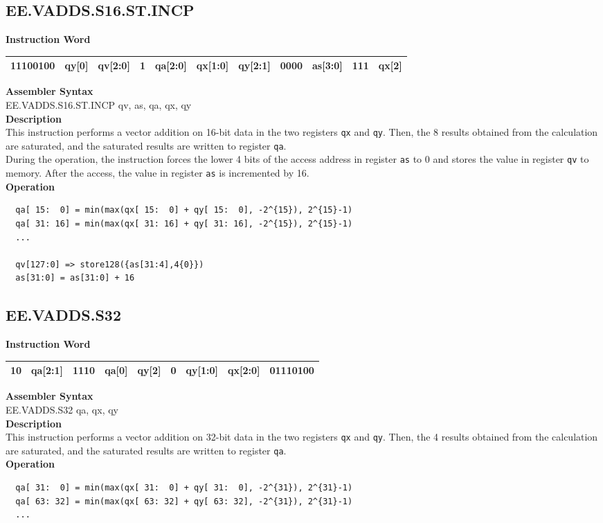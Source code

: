 \clearpage
\subsection{EE.VADDS.S16.ST.INCP}\label{instruction:EEVADDSS16STINCP}
\setlength\tabcolsep{6pt}
\textbf{Instruction Word} \\
\begin{tabular}{|c|c|c|c|c|c|c|c|c|c|c|}
	\hline
	11100100 & qy[0] & qv[2:0] & 1 & qa[2:0] & qx[1:0] & qy[2:1] & 0000 & as[3:0] & 111 & qx[2] \\
	\hline
\end{tabular}

\textbf{Assembler Syntax} \\
EE.VADDS.S16.ST.INCP qv, as, qa, qx, qy \\
\textbf{Description} \\
This instruction performs a vector addition on 16-bit data in the two registers \lstinline{qx} and \lstinline{qy}. Then, the 8 results obtained from the calculation are saturated, and the saturated results are written to register \lstinline{qa}. \\ During the operation, the instruction forces the lower 4 bits of the access address in register \lstinline{as} to 0 and stores the value in register \lstinline{qv} to memory. After the access, the value in register \lstinline{as} is incremented by 16.\\
\textbf{Operation}
\begin{lstlisting}
  qa[ 15:  0] = min(max(qx[ 15:  0] + qy[ 15:  0], -2^{15}), 2^{15}-1)
  qa[ 31: 16] = min(max(qx[ 31: 16] + qy[ 31: 16], -2^{15}), 2^{15}-1)
  ...

  qv[127:0] => store128({as[31:4],4{0}})
  as[31:0] = as[31:0] + 16
\end{lstlisting}

\clearpage
\subsection{EE.VADDS.S32}\label{instruction:EEVADDSS32}
\setlength\tabcolsep{6pt}
\textbf{Instruction Word} \\
\begin{tabular}{|c|c|c|c|c|c|c|c|c|}
	\hline
	10 & qa[2:1] & 1110 & qa[0] & qy[2] & 0 & qy[1:0] & qx[2:0] & 01110100 \\
	\hline
\end{tabular}

\textbf{Assembler Syntax} \\
EE.VADDS.S32 qa, qx, qy \\
\textbf{Description} \\
This instruction performs a vector addition on 32-bit data in the two registers \lstinline{qx} and \lstinline{qy}. Then, the 4 results obtained from the calculation are saturated, and the saturated results are written to register \lstinline{qa}.\\
\textbf{Operation}
\begin{lstlisting}
  qa[ 31:  0] = min(max(qx[ 31:  0] + qy[ 31:  0], -2^{31}), 2^{31}-1)
  qa[ 63: 32] = min(max(qx[ 63: 32] + qy[ 63: 32], -2^{31}), 2^{31}-1)
  ...
\end{lstlisting}

